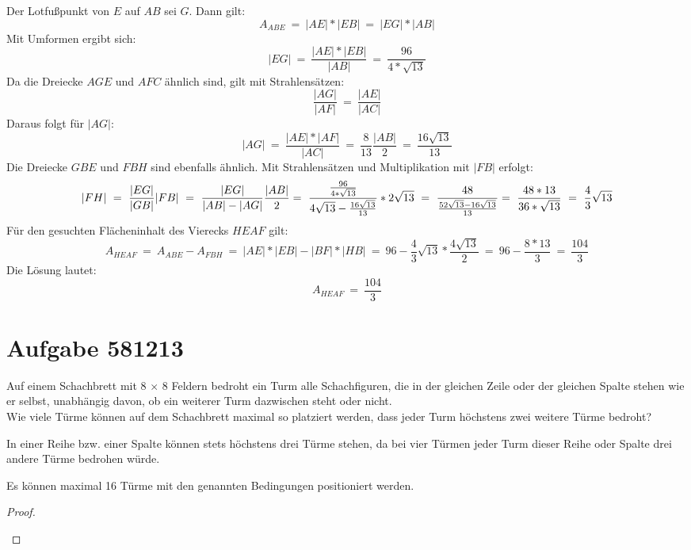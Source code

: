 \documentclass{article}
\begin{document}
Der Lotfußpunkt von $E$ auf $AB$ sei $G$.
Dann gilt:
\[A_{ABE}\ =\ |AE|*|EB|\ =\ |EG|*|AB|\]
Mit Umformen ergibt sich:
\[|EG|\ =\ \frac{|AE|*|EB|}{|AB|}\ =\ \frac{96}{4*\sqrt{13}}\]
Da die Dreiecke $AGE$ und $AFC$ ähnlich sind, gilt mit Strahlensätzen:
\[\frac{|AG|}{|AF|}\ =\ \frac{|AE|}{|AC|}\]
Daraus folgt für $|AG|$:
\[|AG|\ =\ \frac{|AE|*|AF|}{|AC|}\ =\ \frac{8}{13}\frac{|AB|}{2}\ =\ \frac{16\sqrt{13}}{13}\]
Die Dreiecke $GBE$ und $FBH$ sind ebenfalls ähnlich. Mit Strahlensätzen und Multiplikation mit $|FB|$  erfolgt:
\[|FH|\ =\ \frac{|EG|}{|GB|}|FB|\ =\ \frac{|EG|}{|AB|-|AG|}\frac{|AB|}{2}\\
=\ \frac{\frac{96}{4*\sqrt{13}}}{4\sqrt{13}-\frac{16\sqrt{13}}{13}}*2\sqrt{13}\ =\ \frac{48}{\frac{52\sqrt{13}-16\sqrt{13}}{13}}\\
=\ \frac{48*13}{36*\sqrt{13}}\ =\ \frac{4}{3}\sqrt{13}\]
Für den gesuchten Flächeninhalt des Vierecks $HEAF$ gilt:
\[A_{HEAF}\ =\ A_{ABE}-A_{FBH}\ =\ |AE|*|EB|-|BF|*|HB|\ =\ 96-\frac{4}{3}\sqrt{13}*\frac{4\sqrt{13}}{2}\ =\ 96-\frac{8*13}{3}\ =\ \frac{104}{3}\]
Die Lösung lautet: \[A_{HEAF}\ =\ \frac{104}{3}\]

\section{Aufgabe 581213}
Auf einem Schachbrett mit 8 $\times$ 8 Feldern bedroht ein Turm alle Schachfiguren, die in der
gleichen Zeile oder der gleichen Spalte stehen wie er selbst, unabhängig davon, ob ein weiterer
Turm dazwischen steht oder nicht.\\
Wie viele Türme können auf dem Schachbrett maximal so platziert werden, dass jeder Turm
höchstens zwei weitere Türme bedroht?

In einer Reihe bzw. einer Spalte können stets höchstens drei Türme stehen, da bei vier Türmen jeder Turm dieser Reihe oder Spalte drei andere Türme bedrohen würde.

Es können maximal 16 Türme mit den genannten Bedingungen positioniert werden.
\begin{proof}
	\begin{figure}
	\end{figure}
\end{proof}
\end{document}
